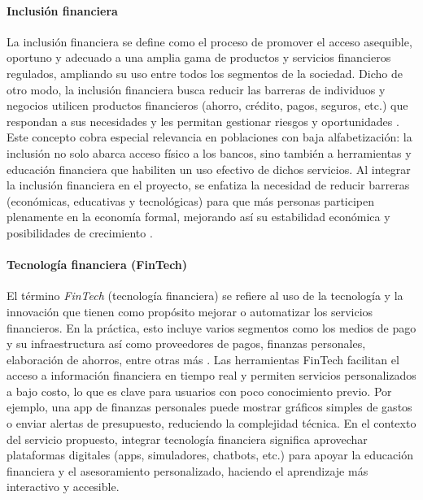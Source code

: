 \paragraph*{Inclusión financiera}
La inclusión financiera se define como el proceso de promover el acceso asequible, oportuno y adecuado a una amplia gama de productos y servicios financieros regulados, ampliando su uso entre todos los segmentos de la sociedad. Dicho de otro modo, la inclusión financiera busca reducir las barreras de individuos y negocios  utilicen productos financieros (ahorro, crédito, pagos, seguros, etc.) que respondan a sus necesidades y les permitan gestionar riesgos y oportunidades \parencite[p.~22]{BancoDesarrollo01}. Este concepto cobra especial relevancia en poblaciones con baja alfabetización: la inclusión no solo abarca acceso físico a los bancos, sino también a herramientas y educación financiera que habiliten un uso efectivo de dichos servicios. Al integrar la inclusión financiera en el proyecto, se enfatiza la necesidad de reducir barreras (económicas, educativas y tecnológicas) para que más personas participen plenamente en la economía formal, mejorando así su estabilidad económica y posibilidades de crecimiento \parencite[p.~2]{OECD01}.

\paragraph*{Tecnología financiera (FinTech)}
El término \textit{FinTech} (tecnología financiera) se refiere al uso de la tecnología y la innovación que tienen como propósito mejorar o automatizar los servicios financieros. En la práctica, esto incluye varios segmentos como los medios de pago y su infraestructura así como proveedores de pagos, finanzas personales, elaboración de ahorros, entre otras más \parencite{BancadeOportunidades02}. Las herramientas FinTech facilitan el acceso a información financiera en tiempo real y permiten servicios personalizados a bajo costo, lo que es clave para usuarios con poco conocimiento previo. Por ejemplo, una app de finanzas personales puede mostrar gráficos simples de gastos o enviar alertas de presupuesto, reduciendo la complejidad técnica. En el contexto del servicio propuesto, integrar tecnología financiera significa aprovechar plataformas digitales (apps, simuladores, chatbots, etc.) para apoyar la educación financiera y el asesoramiento personalizado, haciendo el aprendizaje más interactivo y accesible.

